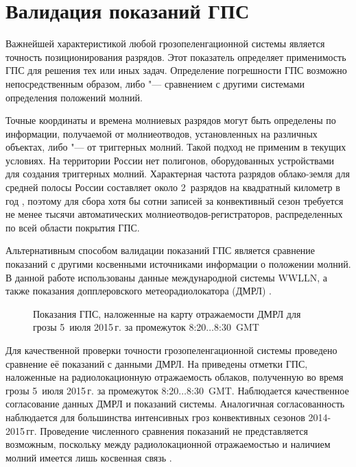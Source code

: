 \section{Валидация показаний ГПС}
\label{sec:lds-valid}
Важнейшей характеристикой любой грозопеленгационной системы является точность позиционирования разрядов. Этот показатель определяет применимость ГПС для решения тех или иных задач. Определение погрешности ГПС возможно непосредственным образом, либо "--- сравнением с другими системами определения положений молний.

Точные координаты и времена молниевых разрядов могут быть определены по информации, получаемой от молниеотводов, установленных на различных объектах, либо "--- от триггерных молний. Такой подход не применим в текущих условиях. На территории России нет полигонов, оборудованных устройствами для создания триггерных молний. Характерная частота разрядов облако-земля для средней полосы России составляет около 2~разрядов на квадратный километр в год \cite{BaruKononovSolomonic}, поэтому для сбора хотя бы сотни записей за конвективный сезон требуется не менее тысячи автоматических молниеотводов-регистраторов, распределенных по всей области покрытия ГПС.

Альтернативным способом валидации показаний ГПС является сравнение показаний с другими косвенными источниками информации о положении молний. В данной работе использованы данные международной системы WWLLN, а также показания допплеровского метеорадиолокатора (ДМРЛ) \cite{BulatovMiG}.

\begin{figure}[h]
	\caption{Показания ГПС, наложенные на карту отражаемости ДМРЛ для грозы 5~июля 2015\,г. за промежуток 8:20$\ldots$8:30~GMT}
	\label{fig:dmrl-lds}
\end{figure}

Для качественной проверки точности грозопеленгационной системы проведено сравнение её показаний с данными ДМРЛ. На  приведены отметки ГПС, наложенные на радиолокационную отражаемость облаков, полученную во время грозы 5~июля 2015\,г. за промежуток 8:20$\ldots$8:30~GMT. Наблюдается качественное согласование данных ДМРЛ и показаний системы. Аналогичная согласованность наблюдается для большинства интенсивных гроз конвективных сезонов 2014-2015\,гг. Проведение численного сравнения показаний не представляется возможным, поскольку между радиолокационной отражаемостью и наличием молний имеется лишь косвенная связь \cite{BulatovMiG}.

